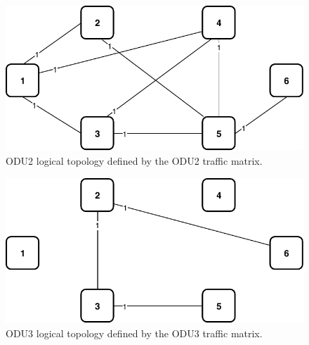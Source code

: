 \newpage
\begin{figure}[h!]
\centering
\includegraphics[width=12cm]{sdf/ilp/translucent_survivability/figures/logical_topology_ODU2_low}
\caption{ODU2 logical topology defined by the ODU2 traffic matrix.}
\label{logical3_ODU2_low}
\end{figure}

\begin{figure}[h!]
\centering
\includegraphics[width=12cm]{sdf/ilp/translucent_survivability/figures/logical_topology_ODU3_low}
\caption{ODU3 logical topology defined by the ODU3 traffic matrix.}
\label{logical3_ODU3_low}
\end{figure}

